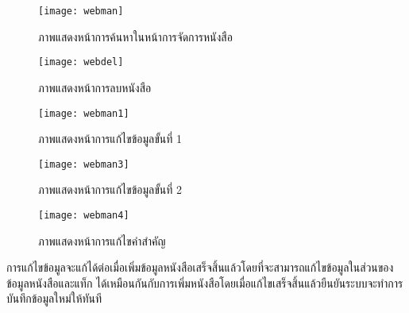 \begin{figure}[H]
    \centering
    \texttt{[image: webman]}
    \caption{ภาพแสดงหน้าการค้นหาในหน้าการจัดการหนังสือ}\label{fig:webman}
\end{figure}

\begin{figure}[H]
    \centering
    \texttt{[image: webdel]}
    \caption{ภาพแสดงหน้าการลบหนังสือ}\label{fig:webdel}
\end{figure}

\begin{figure}[H]
    \centering
    \texttt{[image: webman1]}
    \caption{ภาพแสดงหน้าการแก้ไขข้อมูลขั้นที่ 1}\label{fig:webman1}
\end{figure}

\begin{figure}[H]
    \centering
    \texttt{[image: webman3]}
    \caption{ภาพแสดงหน้าการแก้ไขข้อมูลขั้นที่ 2}\label{fig:webman2}
\end{figure}

\begin{figure}[H]
    \centering
    \texttt{[image: webman4]}
    \caption{ภาพแสดงหน้าการแก้ไขคำสำคัญ}\label{fig:webman4}
\end{figure}

การแก้ไขข้อมูลจะแก้ได้ต่อเมื่อเพิ่มข้อมูลหนังสือเสร็จสิ้นแล้วโดยที่จะสามารถแก้ไขข้อมูลในส่วนของข้อมูลหนังสือและแท็ก ได้เหมือนกันกับการเพิ่มหนังสือโดยเมื่อแก้ไขเสร็จสิ้นแล้วยืนยันระบบจะทำการบันทึกข้อมูลใหม่ให้ทันที